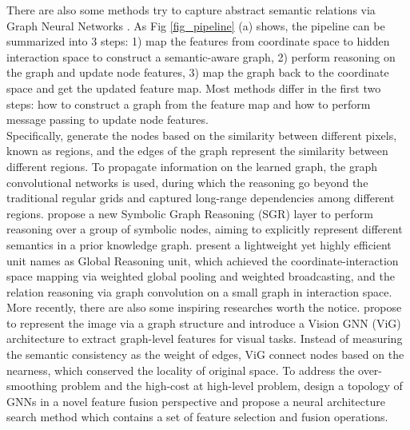\documentclass[journal]{IEEEtran}
\begin{document}
    
    There are also some methods try to capture abstract semantic relations via Graph Neural Networks \cite{li2018beyondgrids}\cite{liang2018symbolicRG}\cite{chen2019glore}. As Fig \ref{fig_pipeline} (a) shows, the pipeline can be summarized into 3 steps: 1) map the features from coordinate space to hidden interaction space to construct a semantic-aware graph, 2) perform reasoning on the graph and update node features, 3) map the graph back to the coordinate space and get the updated feature map. Most methods differ in the first two steps: how to construct a graph from the feature map and how to perform message passing to update node features. \\   
    
    
    Specifically, \cite{li2018beyondgrids} generate the nodes based on the similarity between different pixels, known as regions, and the edges of the graph represent the similarity between different regions. To propagate information on the learned graph, the graph convolutional networks is used\cite{kipf2016GCN}, during which the reasoning go beyond the traditional regular grids and captured long-range dependencies among different regions. \cite{liang2018symbolicRG} propose a new Symbolic Graph Reasoning (SGR) layer to perform reasoning over a group of symbolic nodes, aiming to explicitly represent different semantics in a prior knowledge graph.  \cite{chen2019glore} present a lightweight yet highly efficient unit names as Global Reasoning unit, which achieved the coordinate-interaction space mapping via weighted global pooling and weighted broadcasting, and the relation reasoning via graph convolution on a small graph in interaction space. \\   

    
    More recently, there are also some inspiring researches worth the notice. \cite{han2022VIG} propose to represent the image via a graph structure and introduce a Vision GNN (ViG) architecture to extract graph-level features for visual tasks. Instead of measuring the semantic consistency as the weight of edges, ViG connect nodes based on the nearness, which conserved the locality of original space. To address the over-smoothing problem and the high-cost at high-level problem, \cite{2022TopoGNNFusion} design a topology of GNNs in a novel feature fusion perspective and propose a neural architecture search method which contains a set of feature selection and fusion operations.\\   
\end{document}
